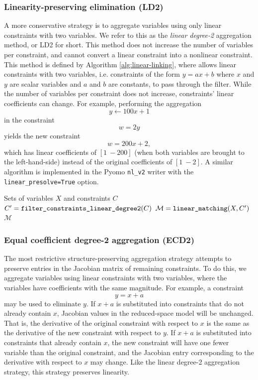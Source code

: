 \documentclass[smallextended]{svjour3}
\newcommand{\rev}[1]{{#1}}
\begin{document}
\subsubsection{Linearity-preserving elimination \rev{(LD2)}}
A more conservative strategy is to aggregate variables using only linear constraints
with two variables. We refer to this as the {\it linear degree-2} aggregation method,
or LD2 for short.
This method does not increase the number of variables per constraint, and cannot
convert a linear constraint into a nonlinear constraint.
\rev{This method is defined by Algorithm \ref{alg:linear-linking},
where \linebreak {\tt filter\_constraints\_linear\_degree2}}
allows linear constraints with two variables, i.e. constraints of the form $y = ax + b$
where $x$ and $y$ are scalar variables and $a$ and $b$ are constants, to pass through
the filter.
While the number of variables per constraint does not increase, constraints' linear
coefficients can change. For example, performing the aggregation
\[ y \leftarrow 100x + 1 \]
in the constraint
\[ w = 2y \]
yields the new constraint
\[ w = 200x + 2, \]
which has linear coefficients of $[1~-200]$ (when both variables are brought to the
left-hand-side) instead of the original coefficients of $[1~-2]$.
A similar algorithm is implemented in the Pyomo {\tt nl\_v2} writer with the
{\tt linear\_presolve=True} option.
\begin{algorithm}
  \caption{: {\tt linear\_degree\_two\_aggregation\_set}}
  \begin{algorithmic}[1]
     Sets of variables $X$ and constraints $C$
    \State $C' = \text{\tt filter\_constraints\_linear\_degree2}(C)$
    \State $\mathcal{M} = \text{\tt linear\_matching}(X, C')$
     $\mathcal{M}$
  \end{algorithmic}
  \label{alg:linear-linking}
\end{algorithm}

\subsubsection{Equal coefficient degree-2 aggregation \rev{(ECD2)}}
The most restrictive structure-preserving aggregation strategy attempts to preserve
entries in the Jacobian matrix of remaining constraints. To do this, we aggregate
variables using linear constraints with two variables, where the variables have
coefficients with the same magnitude. For example, a constraint
\[ y = x + a \]
may be used to eliminate $y$. If $x+a$ is substituted into constraints that
do not already contain $x$, Jacobian values in the reduced-space model will be
unchanged. That is, the derivative of the original constraint with respect to $x$
is the same as the derivative of the new constraint with respect to $y$.
If $x+a$ is substituted into constraints that already contain $x$,
the new constraint will have one fewer variable than the original constraint,
and the Jacobian entry corresponding to the derivative with respect to $x$
may change.
Like the linear degree-2 aggregation strategy, this strategy preserves linearity.
\end{document}
